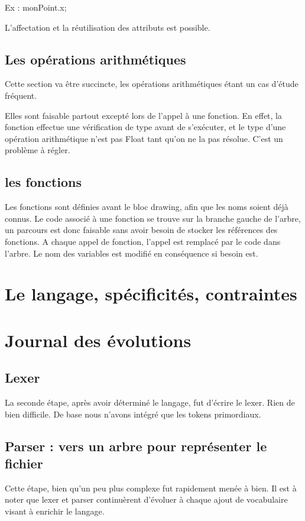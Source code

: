 \documentclass[11pt]{report} %
\begin{document}
Ex :
monPoint.x;

L'affectation et la réutilisation des attributs est possible.

\section{Les opérations arithmétiques}

Cette section va être succincte, les opérations arithmétiques étant un cas d'étude fréquent. 

Elles sont faisable partout excepté lors de l'appel à une fonction. En effet, la fonction effectue une vérification de type avant de s'exécuter, et le type d'une opération arithmétique n'est pas Float tant qu'on ne la pas résolue. C'est un problème à régler.

\section{les fonctions}

Les fonctions sont définies avant le bloc drawing, afin que les noms soient déjà connus. Le code associé à une fonction se trouve sur la branche gauche de l'arbre, un parcours est donc faisable sans avoir besoin de stocker les références des fonctions. A chaque appel de fonction, l'appel est remplacé par le code dans l'arbre. Le nom des variables est modifié en conséquence si besoin est.


\chapter{Le langage, spécificités, contraintes} %

\appendix

\chapter{Journal des évolutions}
\section{Lexer}
La seconde étape, après avoir déterminé le langage, fut d'écrire le lexer. Rien de bien difficile. De base nous n'avons intégré que les tokens primordiaux.
\section{Parser : vers un arbre pour représenter le fichier}
Cette étape, bien qu'un peu plus complexe fut rapidement menée à bien. Il est à noter que lexer et parser continuèrent d'évoluer à chaque ajout de vocabulaire visant à enrichir le langage.
\end{document}
